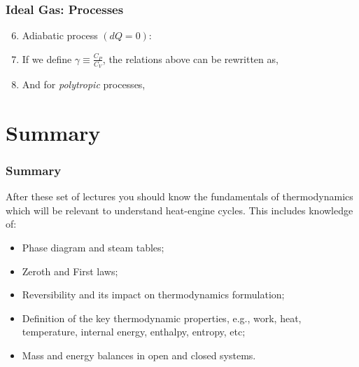 \documentclass[10pt,compress]{beamer}
\begin{document}
\begin{frame}
 \frametitle{Ideal Gas: Processes}
     \begin{enumerate}  \setcounter{enumi}{5}
        \item<1-> Adiabatic process $(dQ= 0)$:
         \item<2-> If we define $\gamma \equiv \displaystyle\frac{C_{P}}{C_{V}}$, the relations above can be rewritten as,
         \item<3-> And for {\it polytropic} processes,
     \end{enumerate} 
  \normalsize
\end{frame}


\section{Summary}
\begin{frame}
 \frametitle{Summary}
After these set of lectures you should know the fundamentals of thermodynamics which will be relevant to understand heat-engine cycles. This includes knowledge of: 
 \begin{itemize}
  \item <2-> Phase diagram and steam tables;
  \item <3-> Zeroth and First laws;
  \item <4-> Reversibility and its impact on thermodynamics formulation;
  \item <5-> Definition of the key thermodynamic properties, e.g., work, heat, temperature, internal energy, enthalpy, entropy, etc;
  \item <6-> Mass and energy balances in open and closed systems.
 \end{itemize}
\end{frame}
\end{document}
